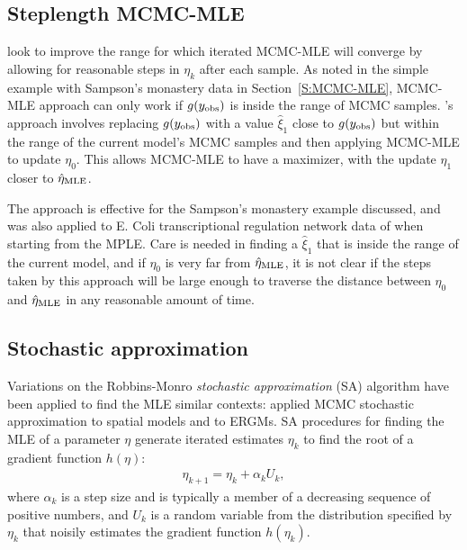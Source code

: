 \subsection{Steplength MCMC-MLE} \label{S:Hummel}
\citet{Hummel} look to improve the range for which iterated MCMC-MLE will converge by
allowing for reasonable steps in $\eta_k$ after each sample.  As noted in the 
simple example with 
Sampson's monastery data in Section~\ref{S:MCMC-MLE}, MCMC-MLE approach can only work 
if $g(y_{\text{obs}})$ is inside the range of MCMC samples.  
\citeauthor{Hummel}'s approach involves 
replacing $g(y_{\text{obs}})$ with a value $\hat{\xi}_1$ close to $g(y_{\text{obs}})$ but within
the range of the current model's MCMC samples
and then applying MCMC-MLE to update $\eta_0$.  This allows MCMC-MLE to have
a maximizer, with the update $\eta_1$ closer to $\hat{\eta}_{\textrm{MLE}}$.

The approach is effective for the Sampson's monastery example discussed, and was also applied
to E. Coli transcriptional regulation network data of \citet{Shen-Orr} when 
starting from the MPLE.  Care is needed in finding a $\hat{\xi}_1$ that is inside
the range of the current model, and if $\eta_0$ is very far from $\hat{\eta}_{\textrm{MLE}}$, it is 
not clear if the steps taken by this approach will be large enough to traverse
the distance between $\eta_0$ and $\hat{\eta}_{\textrm{MLE}}$ in any reasonable amount of time.



%

    
\subsection{Stochastic approximation}

Variations on the Robbins-Monro \emph{stochastic approximation} (SA) algorithm 
\citep{Robbins-Monro} have been applied to find the MLE similar contexts: 
\citet{Younes:1988,Younes:1989,Moyeed:1991,Gu:2001}
applied MCMC stochastic approximation to spatial models and \citet{Snijders:2002} to 
ERGMs.
SA procedures for finding the MLE of a parameter $\eta$ generate iterated estimates 
$\eta_k$ to find the 
root of a gradient function $h(\eta)$:
\begin{align} \label{E:eta SA update}
	\eta_{k+1} = \eta_k + \alpha_k U_k,
\end{align}
where $\alpha_k$ is a step size and is typically a member of a decreasing sequence of 
positive numbers, and $U_k$ is a 
random variable from the distribution specified by $\eta_k$ that noisily estimates the 
gradient function $h(\eta_k)$.  

